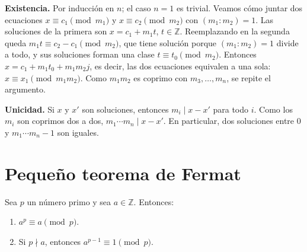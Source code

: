 \begin{demostracion}
\textbf{Existencia.} Por inducción en $n$; el caso $n=1$ es trivial. Veamos cómo
juntar dos ecuaciones $x\equiv c_1 \pmod{m_1}$ y $x\equiv c_2 \pmod{m_2}$ con
$(m_1:m_2)=1$. Las soluciones de la primera son $x=c_1+m_1t$, $t\in\mathbb{Z}$.
Reemplazando en la segunda queda $m_1t\equiv c_2-c_1 \pmod{m_2}$, que tiene
solución porque $(m_1:m_2)=1$ divide a todo, y sus soluciones forman una clase
$t\equiv t_0 \pmod{m_2}$. Entonces $x=c_1+m_1t_0+m_1m_2 j$, es decir, las dos
ecuaciones equivalen a una sola: $x\equiv x_1 \pmod{m_1m_2}$. Como $m_1m_2$ es
coprimo con $m_3,\dots,m_n$, se repite el argumento.

\textbf{Unicidad.} Si $x$ y $x'$ son soluciones, entonces $m_i\mid x-x'$ para
todo $i$. Como los $m_i$ son coprimos dos a dos, $m_1\cdots m_n\mid x-x'$. En
particular, dos soluciones entre $0$ y $m_1\cdots m_n-1$ son iguales.
\end{demostracion}

\section{Pequeño teorema de Fermat}

\begin{proposicion}[{title={Pequeño teorema de Fermat}}]
Sea $p$ un número primo y sea $a\in\mathbb{Z}$. Entonces:
\begin{enumerate}
    \item $a^p\equiv a \pmod p$.
    \item Si $p\nmid a$, entonces $a^{p-1}\equiv 1 \pmod p$.
\end{enumerate}
\end{proposicion}

